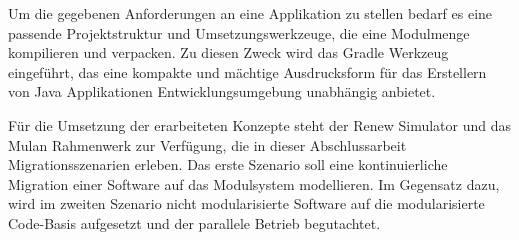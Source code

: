 	Um die gegebenen Anforderungen an eine Applikation zu stellen bedarf es eine passende Projektstruktur und Umsetzungswerkzeuge, die eine Modulmenge kompilieren und verpacken. Zu diesen Zweck wird das Gradle Werkzeug eingeführt, das eine kompakte und mächtige Ausdrucksform für das Erstellern von Java Applikationen Entwicklungsumgebung unabhängig anbietet. \bigbreak

	Für die Umsetzung der erarbeiteten Konzepte steht der Renew Simulator und das Mulan Rahmenwerk zur Verfügung, die in dieser Abschlussarbeit  Migrationsszenarien erleben. Das erste Szenario soll eine kontinuierliche Migration einer Software auf das Modulsystem modellieren. Im Gegensatz dazu, wird im zweiten Szenario nicht modularisierte Software auf die modularisierte Code-Basis aufgesetzt und der parallele Betrieb begutachtet.  

